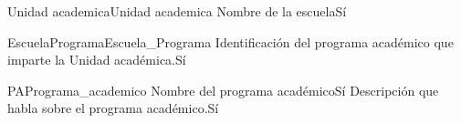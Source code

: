 \begin{cdtEntidad}{Unidad academica}{Unidad academica}
	{Nombre de la escuela}{Sí}
\end{cdtEntidad}
\begin{cdtEntidad}{EscuelaPrograma}{Escuela\_Programa}
	{Identificación del programa académico que imparte la Unidad académica.}{Sí}
\end{cdtEntidad}
\begin{cdtEntidad}{PA}{Programa\_academico}
	{Nombre del programa académico}{Sí}
	{Descripción que habla sobre el programa académico.}{Sí}
\end{cdtEntidad}
